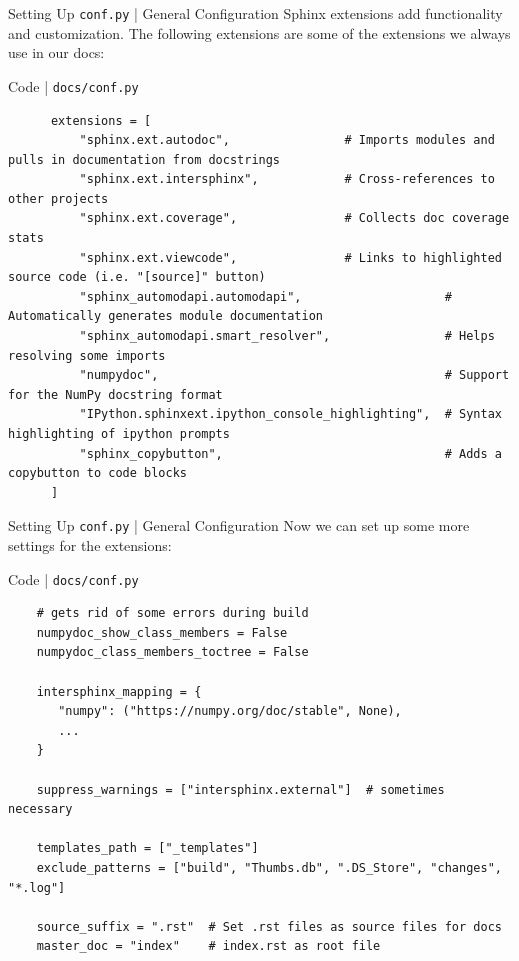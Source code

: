 \begin{frame}[fragile]{Setting Up \texttt{conf.py} | General Configuration}
  Sphinx extensions add functionality and customization. The following extensions
  are some of the extensions we always use in our docs:
  \begin{block}{Code | \texttt{docs/conf.py}}
    \footnotesize
    \begin{verbatim}
      extensions = [
          "sphinx.ext.autodoc",                # Imports modules and pulls in documentation from docstrings
          "sphinx.ext.intersphinx",            # Cross-references to other projects
          "sphinx.ext.coverage",               # Collects doc coverage stats
          "sphinx.ext.viewcode",               # Links to highlighted source code (i.e. "[source]" button)
          "sphinx_automodapi.automodapi",                    # Automatically generates module documentation
          "sphinx_automodapi.smart_resolver",                # Helps resolving some imports
          "numpydoc",                                        # Support for the NumPy docstring format
          "IPython.sphinxext.ipython_console_highlighting",  # Syntax highlighting of ipython prompts
          "sphinx_copybutton",                               # Adds a copybutton to code blocks
      ]
    \end{verbatim}
  \end{block}
\end{frame}

\begin{frame}[fragile]{Setting Up \texttt{conf.py} | General Configuration}
  Now we can set up some more settings for the extensions:
  \begin{block}{Code | \texttt{docs/conf.py}}
    \begin{verbatim}
    # gets rid of some errors during build
    numpydoc_show_class_members = False
    numpydoc_class_members_toctree = False

    intersphinx_mapping = {
       "numpy": ("https://numpy.org/doc/stable", None),
       ...
    }

    suppress_warnings = ["intersphinx.external"]  # sometimes necessary

    templates_path = ["_templates"]
    exclude_patterns = ["build", "Thumbs.db", ".DS_Store", "changes", "*.log"]

    source_suffix = ".rst"  # Set .rst files as source files for docs
    master_doc = "index"    # index.rst as root file
  \end{verbatim}
  \end{block}
\end{frame}


